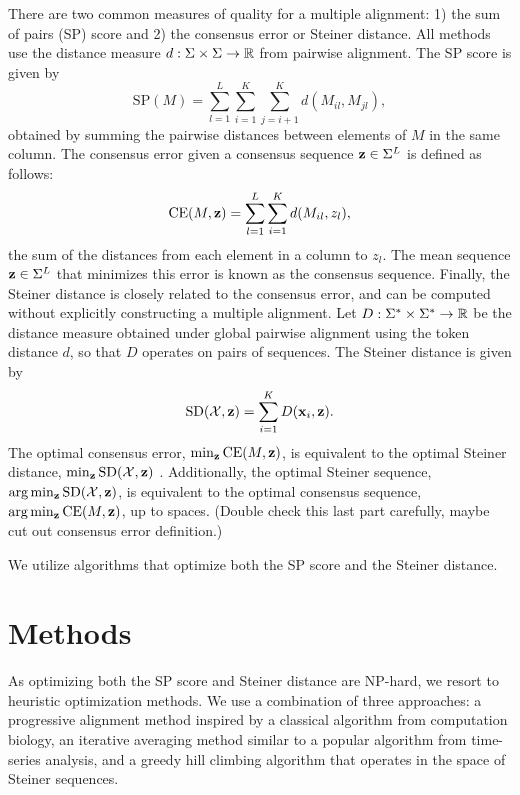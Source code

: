 \documentclass{article}
\begin{document}
There are two common measures of quality for a multiple alignment:
1) the sum of pairs (SP) score and 2) the consensus error or Steiner distance.
All methods use the distance measure $d: \Sigma\times\Sigma\to\mathbb{R}$ from pairwise alignment.
The SP score is given by
\begin{equation}
\mathrm{SP}(M) = \sum_{l=1}^L \sum_{i=1}^K \sum_{j=i+1}^K d(M_{il}, M_{jl}),
\end{equation}
obtained by summing the pairwise distances between elements of $M$ in the same column.
The consensus error given a consensus sequence $\mathbf{z}\in\Sigma^L$ is defined as follows:
\begin{equation}
\mathrm{CE}(M, \mathbf{z}) = \sum_{l=1}^L \sum_{i=1}^K d(M_{il}, z_{l}),
\end{equation}
the sum of the distances from each element in a column to $z_l$.
The mean sequence $\mathbf{z}\in\Sigma^L$ that minimizes this error is known as the consensus sequence.
Finally, the Steiner distance is closely related to the consensus error,
and can be computed without explicitly constructing a multiple alignment.
Let $D: \Sigma^* \times \Sigma^* \to \mathbb{R}$
be the distance measure obtained under global pairwise alignment using the token distance $d$,
so that $D$ operates on pairs of sequences.
The Steiner distance is given by
\begin{equation}
\mathrm{SD}(\mathcal{X}, \mathbf{z}) = \sum_{i=1}^K D(\mathbf{x}_i, \mathbf{z}).
\end{equation}
The optimal consensus error, $\min_{\mathbf{z}}\mathrm{CE}(M,\mathbf{z})$,
is equivalent to the optimal Steiner distance, $\min_{\mathbf{z}}\mathrm{SD}(\mathcal{X}, \mathbf{z})$
\citep{gusfield1997}.
Additionally, the optimal Steiner sequence, $\arg\min_{\mathbf{z}}\mathrm{SD}(\mathcal{X}, \mathbf{z})$,
is equivalent to the optimal consensus sequence, $\arg\min_{\mathbf{z}}\mathrm{CE}(M,\mathbf{z})$,
up to spaces.
(Double check this last part carefully, maybe cut out consensus error definition.)

We utilize algorithms that optimize both the SP score and the Steiner distance.

\section{Methods}
As optimizing both the SP score and Steiner distance are NP-hard,
we resort to heuristic optimization methods.
We use a combination of three approaches: a progressive alignment method
inspired by a classical algorithm from computation biology,
an iterative averaging method similar to a popular algorithm from time-series analysis,
and a greedy hill climbing algorithm that operates in the space of Steiner sequences.
\end{document}
